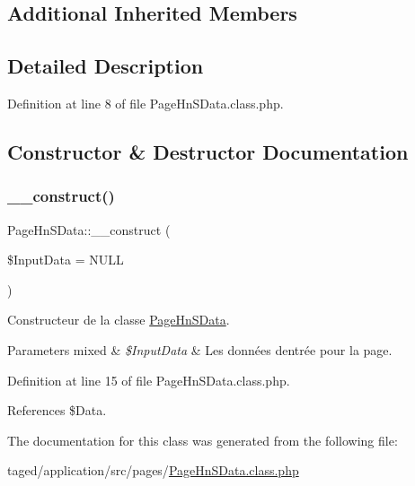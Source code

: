 \subsection*{Additional Inherited Members}


\subsection{Detailed Description}


Definition at line 8 of file Page\+Hn\+S\+Data.\+class.\+php.



\subsection{Constructor \& Destructor Documentation}
\mbox{\label{class_page_hn_s_data_a55512991b31d1cacb3448fbfed9e8d2b}} 
\subsubsection{\texorpdfstring{\+\_\+\+\_\+construct()}{\_\_construct()}}
{\footnotesize\ttfamily Page\+Hn\+S\+Data\+::\+\_\+\+\_\+construct (\begin{DoxyParamCaption}\item[{}]{\$\+Input\+Data = {\ttfamily NULL} }\end{DoxyParamCaption})}

Constructeur de la classe \hyperlink{class_page_hn_s_data}{Page\+Hn\+S\+Data}.


\begin{DoxyParams}[1]{Parameters}
mixed & {\em \$\+Input\+Data} & Les données d\textquotesingle{}entrée pour la page. \\
\hline
\end{DoxyParams}


Definition at line 15 of file Page\+Hn\+S\+Data.\+class.\+php.



References \$\+Data.



The documentation for this class was generated from the following file\+:\begin{DoxyCompactItemize}
\item 
taged/application/src/pages/\hyperlink{_page_hn_s_data_8class_8php}{Page\+Hn\+S\+Data.\+class.\+php}\end{DoxyCompactItemize}
